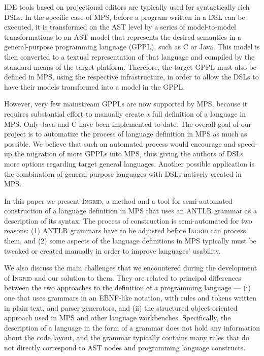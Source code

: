 IDE tools based on projectional editors are typically used for syntactically rich DSLs.
In the specific case of MPS, before a program written in a DSL can be executed, it is transformed on the AST level by a series of model-to-model transformations to an AST model that represents the desired semantics in a general-purpose programming language (GPPL), such as C or Java.
This model is then converted to a textual representation of that language and compiled by the standard means of the target platform.
Therefore, the target GPPL must also be defined in MPS, using the respective infrastructure, in order to allow the DSLs to have their models transformed into a model in the GPPL.

However, very few mainstream GPPLs are now supported by MPS, because it requires substantial effort to manually create a full definition of a language in MPS.
Only Java and C have been implemented to date.
The overall goal of our project is to automatize the process of language definition in MPS as much as possible.
We believe that such an automated process would encourage and speed-up the migration of more GPPLs into MPS, thus giving the authors of DSLs more options regarding target general languages.
Another possible application is the combination of general-purpose languages with DSLs natively created in MPS.

In this paper we present \textsc{Ingrid}, a method and a tool for semi-automated construction of a language definition in MPS that uses an ANTLR grammar as a description of its syntax.
The process of construction is semi-automated for two reasons: (1) ANTLR grammars have to be adjusted before \textsc{Ingrid} can process them, and (2) some aspects of the language definitions in MPS typically must be tweaked or created manually in order to improve languages' usability.

We also discuss the main challenges that we encountered during the development of \textsc{Ingrid} and our solution to them.
They are related to principal differences between the two approaches to the definition of a programming language --- (i) one that uses grammars in an EBNF-like notation, with rules and tokens written in plain text, and parser generators, and (ii) the structured object-oriented approach used in MPS and other language workbenches.
Specifically, the description of a language in the form of a grammar does not hold any information about the code layout, and the grammar typically contains many rules that do not directly correspond to AST nodes and programming language constructs.

